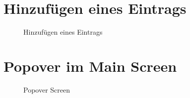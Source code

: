 \documentclass[
    DIV12,
    cleardouble=plain,
    headings=normal,
    pdftex,
    headexclude,footexclude,
    final
]{scrreprt}
\begin{document}
\section{Hinzufügen eines Eintrags}
\begin{figure}[H]
	\centering
	\caption{Hinzufügen eines Eintrags}
	\label{add_entwurf}
\end{figure}


\section{Popover im Main Screen}
\begin{figure}[H]
	\centering
	\caption{Popover Screen}
	\label{popover}
\end{figure}
\end{document}

